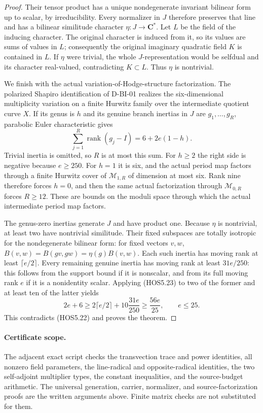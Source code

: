 \begin{proof}
Their tensor product has a unique nondegenerate invariant bilinear
form up to scalar, by irreducibility. Every normalizer in $J$
therefore preserves that line and has a bilinear similitude
character $\eta:J\to\mathbf C^*$. Let $L$ be the field of the
inducing character. The original character is induced from it,
so its values are sums of values in $L$; consequently the original
imaginary quadratic field $K$ is contained in $L$. If $\eta$
were trivial, the whole $J$-representation would be selfdual
and its character real-valued, contradicting $K\subset L$.
Thus $\eta$ is nontrivial.

We finish with the actual variation-of-Hodge-structure factorization.
The polarized Shapiro identification of D-BI-01 realizes the
six-dimensional multiplicity variation on a finite Hurwitz family
over the intermediate quotient curve $X$. If its genus is $h$
and its genuine branch inertias in $J$ are $g_1,\ldots,g_R$,
parabolic Euler characteristic gives
\[
        \sum_{j=1}^R\operatorname{rank}(g_j-I)
                        =6+2e(1-h).                         \tag{HOS5.23}
\]
Trivial inertia is omitted, so $R$ is at most this sum. For
$h\ge2$ the right side is negative because $e\ge250$. For
$h=1$ it is six, and the actual period map factors through a
finite Hurwitz cover of $\mathcal M_{1,R}$ of dimension at
most six. Rank nine therefore forces $h=0$, and then the
same actual factorization through $\mathcal M_{0,R}$ forces
$R\ge12$. These are bounds on the moduli space through which the
actual intermediate period map factors.

The genus-zero inertias generate $J$ and have product one.
Because $\eta$ is nontrivial, at least two have nontrivial
similitude. Their fixed subspaces are totally isotropic for the
nondegenerate bilinear form: for fixed vectors $v,w$,
$B(v,w)=B(gv,gw)=\eta(g)B(v,w)$. Each such inertia has moving
rank at least $\lceil e/2\rceil$. Every remaining genuine
inertia has moving rank at least $31e/250$: this follows from
the support bound if it is nonscalar, and from its full moving
rank $e$ if it is a nonidentity scalar. Applying (HOS5.23) to
two of the former and at least ten of the latter yields
\[
 2e+6\ge2\lceil e/2\rceil+10\frac{31e}{250}
          \ge\frac{56e}{25},\qquad e\le25.                 \tag{HOS5.24}
\]
This contradicts (HOS5.22) and proves the theorem.
\end{proof}

\paragraph{Certificate scope.}
The adjacent exact script checks the transvection trace and power
identities, all nonzero field parameters, the line-radical and
opposite-radical identities, the two self-adjoint multiplier types,
the constant inequalities, and the source-budget arithmetic. The
universal generation, carrier, normalizer, and source-factorization
proofs are the written arguments above. Finite matrix checks are
not substituted for them.
